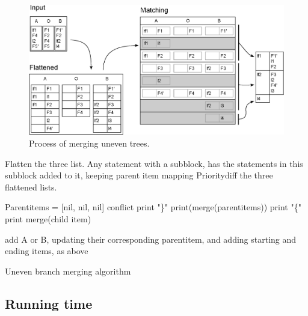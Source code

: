 \documentclass[11pt]{article}
\begin{document}
\begin{figure}
   \centerline{\includegraphics[scale=0.55]{drawings/html/EditedFlattenedMerge.eps}}
   \caption{Process of merging uneven trees.}
   \label{UeventreeProcess}
\end{figure}

\begin{algorithm}
\begin{algorithmic}
    \State Flatten the three list. Any statement with a subblock, has the statements in this subblock added to it, keeping parent item mapping
    \State Prioritydiff the three flattened lists.

    \State Parentitems = [nil, nil, nil]
                \State \Return conflict
			\EndIf
                    \State print "\}"
                \EndIf
                    \State print(merge(parentitems))
                    	\State print "\{"
                    \EndIf
                \EndIf
			\EndIf
            \State print merge(child item)

                \State add A or B, updating their corresponding parentitem,
                \State and adding starting and ending items, as above
        \EndIf
   \EndFor

\EndFunction
\end{algorithmic}
\caption{Uneven branch merging algorithm}
\label{MergeUneven}
\end{algorithm}


\subsection{Running time}
\end{document}
